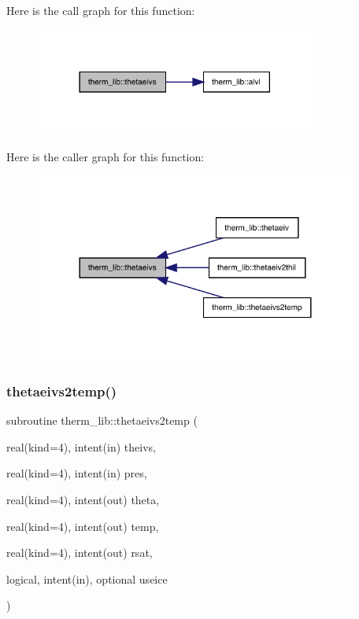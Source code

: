 Here is the call graph for this function\+:
\nopagebreak
\begin{figure}[H]
\begin{center}
\leavevmode
\includegraphics[width=261pt]{namespacetherm__lib_a59bae4be9ba9f862c7b58953f37a9be2_cgraph}
\end{center}
\end{figure}
Here is the caller graph for this function\+:
\nopagebreak
\begin{figure}[H]
\begin{center}
\leavevmode
\includegraphics[width=300pt]{namespacetherm__lib_a59bae4be9ba9f862c7b58953f37a9be2_icgraph}
\end{center}
\end{figure}
\mbox{\label{namespacetherm__lib_a8067ee37cd0529f1940178817b175cbc}} 
\subsubsection{\texorpdfstring{thetaeivs2temp()}{thetaeivs2temp()}}
{\footnotesize\ttfamily subroutine therm\+\_\+lib\+::thetaeivs2temp (\begin{DoxyParamCaption}\item[{real(kind=4), intent(in)}]{theivs,  }\item[{real(kind=4), intent(in)}]{pres,  }\item[{real(kind=4), intent(out)}]{theta,  }\item[{real(kind=4), intent(out)}]{temp,  }\item[{real(kind=4), intent(out)}]{rsat,  }\item[{logical, intent(in), optional}]{useice }\end{DoxyParamCaption})}

